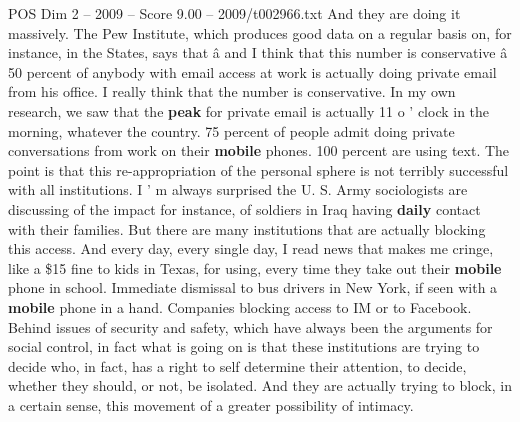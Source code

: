\begin{textsample}{POS Dim 2 – 2009 – Score 9.00 – 2009/t002966.txt}
And they are doing it massively.
The Pew Institute, which produces good data on a regular basis on, for instance, in the States, says that â and I think that this number is conservative â 50 percent of anybody with email access at work is actually doing private email from his office.
I really think that the number is conservative.
In my own research, we saw that the \textbf{peak} for private email is actually 11 o ' clock in the morning, whatever the country. 75 percent of people admit doing private conversations from work on their \textbf{mobile} phones. 100 percent are using text.
The point is that this re-appropriation of the personal sphere is not terribly successful with all institutions.
I ' m always surprised the U.
S.
Army sociologists are discussing of the impact for instance, of soldiers in Iraq having \textbf{daily} contact with their families.
But there are many institutions that are actually blocking this access.
And every day, every single day, I read news that makes me cringe, like a \$15 fine to kids in Texas, for using, every time they take out their \textbf{mobile} phone in school.
Immediate dismissal to bus drivers in New York, if seen with a \textbf{mobile} phone in a hand.
Companies blocking access to IM or to Facebook.
Behind issues of security and safety, which have always been the arguments for social control, in fact what is going on is that these institutions are trying to decide who, in fact, has a right to self determine their attention, to decide, whether they should, or not, be isolated.
And they are actually trying to block, in a certain sense, this movement of a greater possibility of intimacy.

\end{textsample}
